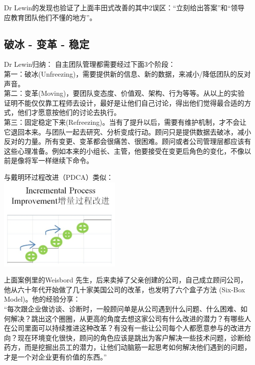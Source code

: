Dr Lewin的发现也验证了上面丰田式改善的其中2误区：“立刻给出答案”和“领导应教育团队他们不懂的地方”。

\hypertarget{ux7834ux51b0---ux53d8ux9769---ux7a33ux5b9a}{%
\subsection{破冰 - 变革 -
稳定}\label{ux7834ux51b0---ux53d8ux9769---ux7a33ux5b9a}}

Dr Lewin归纳： 自主团队管理都需要经过下面3个阶段：\\
第一：破冰(Unfreezing)，需要提供新的信息、新的数据，来减小/降低团队的反对声音。\\
第二：变革(Moving)，要团队变态度、价值观、架构、行为等等。从以上的实验证明不能仅仅靠工程师去设计，最好是让他们自己讨论，得出他们觉得最合适的方式，他们才愿意按他们的讨论去执行。\\
第三：固定稳定下来(Refreezing)。当有了提升以后，需要有维护机制，才不会让它退回本来。与团队一起去研究、分析变成行动。顾问只是提供数据去破冰，减小反对的力量。所有变更、变革都会很痛苦、很困难。顾问或者公司管理层都应该有这些心理准备。例如本来的小组长、主管，他要接受在变更后角色的变化，不像以前是像将军一样继续下命令。

与戴明环过程改进（PDCA）类似：\\

\includegraphics[width=6cm]{IPM.jpg}


上面案例里的Weisbord
先生，后来卖掉了父亲创建的公司，自己成立顾问公司，他从六十年代开始做了几十家美国公司的改革，也发明了六个盒子方法
(Six-Box Model)。他的经验分享：\\
``每次跟企业做访谈、诊断时，一般顾问单是从公司遇到什么问题、什么困难、如何解决？跳出这个圈圈，从更高的角度去想这家公司有什么改进的潜力？有哪些人在公司里面可以持续推进这种改革？有没有一些让公司每个人都愿意参与的改进方向？现在环境变化很快，顾问的角色应该是跳出为客户解决一些技术问题，诊断给药方，而是挖掘出员工的潜力，让他们动脑筋一起思考如何解决他们遇到的问题，才是一个对企业更有价值的东西。''\\


